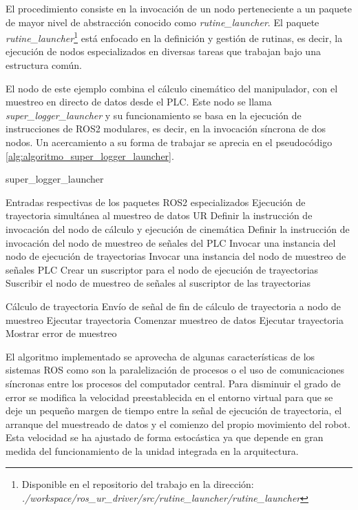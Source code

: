 El procedimiento consiste en la invocación de un nodo perteneciente a un paquete de mayor nivel de abstracción conocido como \textit{rutine\_launcher}. El paquete \textit{rutine\_launcher}\footnote{Disponible en el repositorio del trabajo en la dirección:  \textit{./workspace/ros\_ur\_driver/src/rutine\_launcher/rutine\_launcher}} está enfocado en la definición y gestión de rutinas, es decir, la ejecución de nodos especializados en diversas tareas que trabajan bajo una estructura común. 

El nodo de este ejemplo combina el cálculo cinemático del manipulador, con el muestreo en directo de datos desde el \acrshort{PLC}. Este nodo se llama \textit{super\_logger\_launcher} y su funcionamiento se basa en la ejecución de instrucciones de ROS2 modulares, es decir, en la invocación síncrona de dos nodos. Un acercamiento a su forma de trabajar se aprecia en el pseudocódigo \ref{alg:algoritmo_super_logger_launcher}.


\begin{algorithm}[h!]
\caption{super\_logger\_launcher}\label{alg:algoritmo_super_logger_launcher}
\begin{algorithmic}[1]
\Require Entradas respectivas de los paquetes ROS2 especializados
\Ensure Ejecución de trayectoria simultánea al muestreo de datos UR
\State Definir la instrucción de invocación del nodo de cálculo y ejecución de cinemática
\State Definir la instrucción de invocación del nodo de muestreo de señales del PLC
\State Invocar una instancia del nodo de ejecución de trayectorias
\State Invocar una instancia del nodo de muestreo de señales PLC
\State Crear un suscriptor para el nodo de ejecución de trayectorias
\State Suscribir el nodo de muestreo de señales al suscriptor de las trayectorias

    \State Cálculo de trayectoria
    \State Envío de señal de fin de cálculo de trayectoria a nodo de muestreo
        \State Ejecutar trayectoria
        \State Comenzar muestreo de datos
    \Else 
        \State Ejecutar trayectoria
        \State Mostrar error de muestreo
    \EndIf
\EndIf

\end{algorithmic}
\end{algorithm}

El algoritmo implementado se aprovecha de algunas características de los sistemas ROS como son la paralelización de procesos o el uso de comunicaciones síncronas entre los procesos del computador central. Para disminuir el grado de error se modifica la velocidad preestablecida en el entorno virtual para que se deje un pequeño margen de tiempo entre la señal de ejecución de trayectoria, el arranque del muestreado de datos y el comienzo del propio movimiento del robot. Esta velocidad se ha ajustado de forma estocástica ya que depende en gran medida del funcionamiento de la unidad integrada en la arquitectura.

